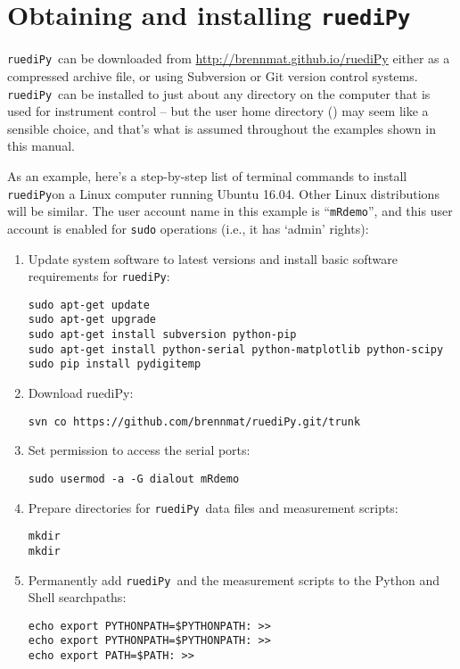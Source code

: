 \documentclass[12pt]{article}   	%
\newcommand{\ruediPy}{\texttt{ruediPy}}
\begin{document}
\section{Obtaining and installing \ruediPy}
\ruediPy\ can be downloaded from \url{http://brennmat.github.io/ruediPy} either as a compressed archive file, or using Subversion or Git version control systems. \ruediPy\ can be installed to just about any directory on the computer that is used for instrument control -- but the user home directory  () may seem like a sensible choice, and that's what is assumed throughout the examples shown in this manual.

As an example, here's a step-by-step list of terminal commands to install \ruediPy  on a Linux computer running Ubuntu 16.04. Other Linux distributions will be similar. The user account name in this example is ``\texttt{mRdemo}'', and this user account is enabled for \texttt{sudo} operations (i.e., it has `admin' rights):
\begin{enumerate}

\item Update system software to latest versions and install basic software requirements for \ruediPy:\par
\texttt{sudo apt-get update}\\
\texttt{sudo apt-get upgrade}\\
\texttt{sudo apt-get install subversion python-pip}\\
\texttt{sudo apt-get install python-serial python-matplotlib python-scipy}\\
\texttt{sudo pip install pydigitemp}\\

\item Download ruediPy:\par
\texttt{svn co https://github.com/brennmat/ruediPy.git/trunk }


\item Set permission to access the serial ports:\par
\texttt{sudo usermod -a -G dialout mRdemo}

\item Prepare directories for \ruediPy\ data files and measurement scripts:\par
\texttt{mkdir }\\
\texttt{mkdir }

\item Permanently add \ruediPy\ and the measurement scripts to the Python and Shell searchpaths:\par
\texttt{echo export PYTHONPATH=\textsc{}\$PYTHONPATH\textsc{}: >> }\\
\texttt{echo export PYTHONPATH=\textsc{}\$PYTHONPATH\textsc{}: >> }\\
\texttt{echo export PATH=\textsc{}\$PATH\textsc{}: >> }

\end{enumerate}
\end{document}

